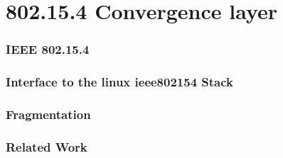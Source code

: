 \chapter{802.15.4 Convergence layer}
\subsection{IEEE 802.15.4}
\subsection{Interface to the linux ieee802154 Stack}
\subsection{Fragmentation}
\subsection{Related Work}

